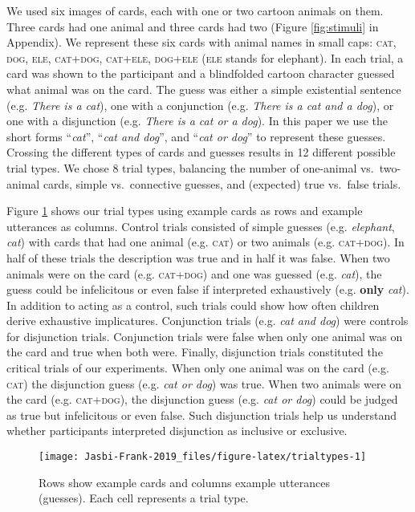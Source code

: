 \documentclass[,man,floatsintext]{apa6}
\begin{document}
We used six images of cards, each with one or two cartoon animals on them. Three cards had one animal and three cards had two (Figure \ref{fig:stimuli} in Appendix). We represent these six cards with animal names in small caps: \textsc{cat, dog, ele, cat+dog, cat+ele, dog+ele} (\textsc{ele} stands for elephant). In each trial, a card was shown to the participant and a blindfolded cartoon character guessed what animal was on the card. The guess was either a simple existential sentence (e.g. \emph{There is a cat}), one with a conjunction (e.g. \emph{There is a cat and a dog}), or one with a disjunction (e.g. \emph{There is a cat or a dog}). In this paper we use the short forms \enquote{\emph{cat}}, \enquote{\emph{cat and dog}}, and \enquote{\emph{cat or dog}} to represent these guesses. Crossing the different types of cards and guesses results in 12 different possible trial types. We chose 8 trial types, balancing the number of one-animal vs.~two-animal cards, simple vs.~connective guesses, and (expected) true vs.~false trials.

Figure \ref{fig:trialtypes} shows our trial types using example cards as rows and example utterances as columns. Control trials consisted of simple guesses (e.g. \emph{elephant}, \emph{cat}) with cards that had one animal (e.g. \textsc{cat}) or two animals (e.g. \textsc{cat+dog}). In half of these trials the description was true and in half it was false. When two animals were on the card (e.g. \textsc{cat+dog}) and one was guessed (e.g. \emph{cat}), the guess could be infelicitous or even false if interpreted exhaustively (e.g. \textbf{only} \emph{cat}). In addition to acting as a control, such trials could show how often children derive exhaustive implicatures. Conjunction trials (e.g. \emph{cat and dog}) were controls for disjunction trials. Conjunction trials were false when only one animal was on the card and true when both were. Finally, disjunction trials constituted the critical trials of our experiments. When only one animal was on the card (e.g. \textsc{cat}) the disjunction guess (e.g. \emph{cat or dog}) was true. When two animals were on the card (e.g. \textsc{cat+dog}), the disjunction guess (e.g. \emph{cat or dog}) could be judged as true but infelicitous or even false. Such disjunction trials help us understand whether participants interpreted disjunction as inclusive or exclusive.

\begin{figure}

{\centering \texttt{[image: Jasbi-Frank-2019\_files/figure-latex/trialtypes-1]} 

}

\caption{Rows show example cards and columns example utterances (guesses). Each cell represents a trial type.}\label{fig:trialtypes}
\end{figure}
\end{document}

